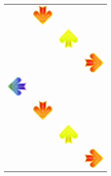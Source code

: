 \begin{center}
\begin{table}[ht]
\begin{minipage}{.5\linewidth}
\begin{tabular}[b]{cccc}
				  & \includegraphics[width=1cm]{figures/032/down.png}       
				  &                                                         
				  &                                                         
				\\
				[-27.5pt]
				  &                                                         
				  & \includegraphics[width=1cm]{figures/016/up.png}         
				  &                                                         
				\\
				[-27.5pt]
				  &                                                         
				  &                                                         
				  & \includegraphics[width=1cm]{figures/032/right.png}      
				\\
				[-27.5pt]
				\includegraphics[width=1cm]{figures/008/left.png}
				  &                                                         
				  &                                                         
				  &                                                         
				\\
				[-27.5pt]
				
				  & \includegraphics[width=1cm]{figures/032/down.png}       
				  &                                                         
				  &                                                         
				\\
				[-27.5pt]
				  &                                                         
				  & \includegraphics[width=1cm]{figures/016/up.png}         
				  &                                                         
				\\
				[-27.5pt]
				  &                                                         
				  &                                                         
				  & \includegraphics[width=1cm]{figures/032/right.png}      
			\end{tabular}%
			

\end{minipage}
\end{table}
\end{center}
